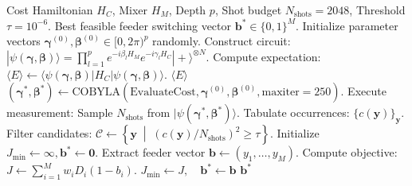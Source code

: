 \documentclass[11pt,a4paper]{article}
\theoremstyle{definition}
\theoremstyle{remark}
\begin{document}
\begin{algorithm}[H]
\caption{Hybrid QAOA Variational Execution and Classical COBYLA Loop}
\label{alg:qaoa_loop}
\begin{algorithmic}[1]
\REQUIRE Cost Hamiltonian $H_C$, Mixer $H_M$, Depth $p$, Shot budget $N_{\text{shots}} = 2048$, Threshold $\tau = 10^{-6}$.
\ENSURE Best feasible feeder switching vector $\mathbf{b}^* \in \{0, 1\}^M$.
\STATE Initialize parameter vectors $\boldsymbol{\gamma}^{(0)}, \boldsymbol{\beta}^{(0)} \in [0, 2\pi)^p$ randomly.
    \STATE Construct circuit: $|\psi(\boldsymbol{\gamma}, \boldsymbol{\beta})\rangle = \prod_{l=1}^p e^{-i \beta_l H_M} e^{-i \gamma_l H_C} |+\rangle^{\otimes N}$.
    \STATE Compute expectation: $\langle E \rangle \leftarrow \langle \psi(\boldsymbol{\gamma}, \boldsymbol{\beta}) | H_C | \psi(\boldsymbol{\gamma}, \boldsymbol{\beta}) \rangle$.
    \RETURN $\langle E \rangle$
\ENDFUNCTION
\STATE $(\boldsymbol{\gamma}^*, \boldsymbol{\beta}^*) \leftarrow \text{COBYLA}(\text{EvaluateCost}, \boldsymbol{\gamma}^{(0)}, \boldsymbol{\beta}^{(0)}, \text{maxiter}=250)$.
\STATE Execute measurement: Sample $N_{\text{shots}}$ from $|\psi(\boldsymbol{\gamma}^*, \boldsymbol{\beta}^*)\rangle$.
\STATE Tabulate occurrences: $\{c(\mathbf{y})\}_{\mathbf{y}}$.
\STATE Filter candidates: $\mathcal{C} \leftarrow \left\{ \mathbf{y} \;\middle|\; (c(\mathbf{y})/N_{\text{shots}})^2 \ge \tau \right\}$.
\STATE Initialize $J_{\min} \leftarrow \infty, \mathbf{b}^* \leftarrow \mathbf{0}$.
    \STATE Extract feeder vector $\mathbf{b} \leftarrow (y_1, \dots, y_M)$.
        \STATE Compute objective: $J \leftarrow \sum_{i=1}^M w_i D_i (1 - b_i)$.
            \STATE $J_{\min} \leftarrow J, \quad \mathbf{b}^* \leftarrow \mathbf{b}$
        \ENDIF
    \ENDIF
\ENDFOR
\RETURN $\mathbf{b}^*$
\end{algorithmic}
\end{algorithm}
\end{document}
